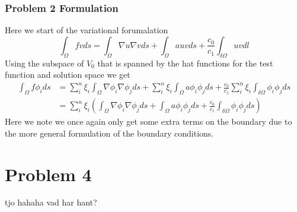 \documentclass[11pt]{article}
\begin{document}
\subsubsection{Problem 2 Formulation}
Here we start of the variational forumalation
\begin{equation}
	\int_{\Omega} f v ds = \int_{\Omega} \nabla u \nabla v ds + \int_{\Omega} a u v ds + \frac{c_0}{c_1}\int_{\delta \Omega} u v dl 
\end{equation} 
Using the subspace of $V_0$ that is spanned by the hat functions for the test function and solution space we get
\begin{align}
	\int_{\Omega} f \phi_i ds &= \sum^n_i \xi_i \int_{\Omega} \nabla \phi_i \nabla \phi_j ds + \sum^n_i \xi_i \int_{\Omega} a \phi_i \phi_j  ds + \frac{c_0}{c_1} \sum^n_i \xi_i \int_{\delta \Omega} \phi_i \phi_j ds \\
	&= \sum^n_i \xi_i ( \int_{\Omega} \nabla \phi_i \nabla \phi_j ds + \int_{\Omega} a \phi_i \phi_j  ds + \frac{c_0}{c_1} \int_{\delta \Omega} \phi_i \phi_j ds )
\end{align}
Here we note we once again only get some extra terms on the boundary due to the more general formulation of the boundary conditions. 

\section{Problem 4}
tjo hahaha vad har hant?
\end{document}
